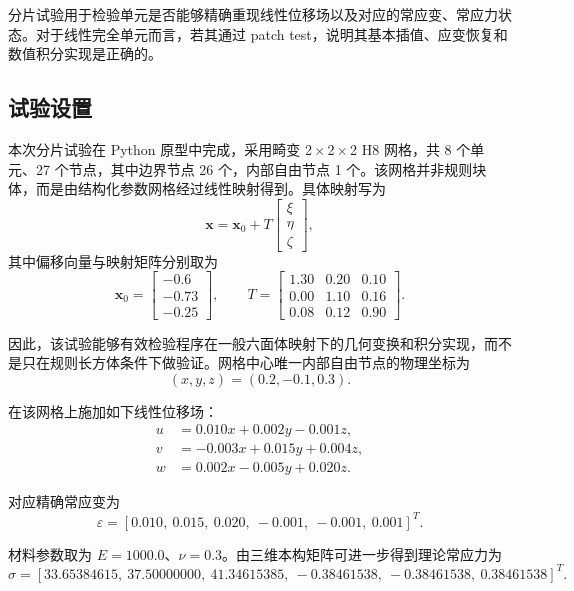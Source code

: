 \documentclass[12pt,a4paper]{article}
\begin{document}
分片试验用于检验单元是否能够精确重现线性位移场以及对应的常应变、常应力状态。对于线性完全单元而言，若其通过 patch test，说明其基本插值、应变恢复和数值积分实现是正确的。

\subsection{试验设置}

本次分片试验在 Python 原型中完成，采用畸变 2\,$\times$\,2\,$\times$\,2 H8 网格，共 8 个单元、27 个节点，其中边界节点 26 个，内部自由节点 1 个。该网格并非规则块体，而是由结构化参数网格经过线性映射得到。具体映射写为
\begin{equation}
\mathbf{x}=\mathbf{x}_0+T
\begin{bmatrix}
\xi \\
\eta \\
\zeta
\end{bmatrix},
\end{equation}
其中偏移向量与映射矩阵分别取为
\begin{equation}
\mathbf{x}_0=
\begin{bmatrix}
-0.6 \\
-0.73 \\
-0.25
\end{bmatrix},
\qquad
T=
\begin{bmatrix}
1.30 & 0.20 & 0.10 \\
0.00 & 1.10 & 0.16 \\
0.08 & 0.12 & 0.90
\end{bmatrix}.
\end{equation}

因此，该试验能够有效检验程序在一般六面体映射下的几何变换和积分实现，而不是只在规则长方体条件下做验证。网格中心唯一内部自由节点的物理坐标为
\begin{equation}
(x,y,z)=(0.2,-0.1,0.3).
\end{equation}

在该网格上施加如下线性位移场：
\begin{align}
u &= 0.010x + 0.002y - 0.001z, \\
v &= -0.003x + 0.015y + 0.004z, \\
w &= 0.002x - 0.005y + 0.020z.
\end{align}

对应精确常应变为
\begin{equation}
\varepsilon = [0.010,\ 0.015,\ 0.020,\ -0.001,\ -0.001,\ 0.001]^T.
\end{equation}

材料参数取为 $E=1000.0$、$\nu=0.3$。由三维本构矩阵可进一步得到理论常应力为
\begin{equation}
\sigma = [33.65384615,\ 37.50000000,\ 41.34615385,\ -0.38461538,\ -0.38461538,\ 0.38461538]^T.
\end{equation}
\end{document}
